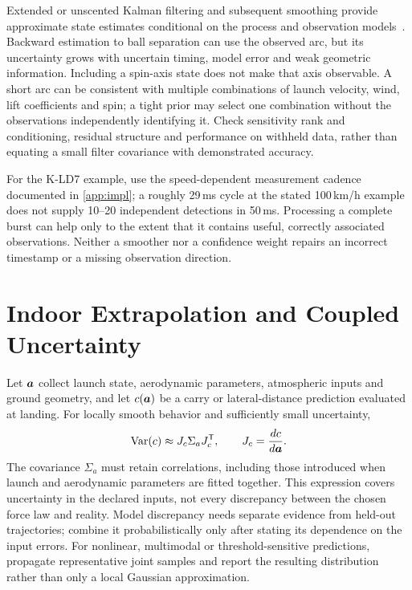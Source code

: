 Extended or unscented Kalman filtering and subsequent smoothing provide approximate state estimates conditional on the process and observation models~\cite{sarkkasvensson2023}.
Backward estimation to ball separation can use the observed arc, but its uncertainty grows with uncertain timing, model error and weak geometric information.
Including a spin-axis state does not make that axis observable.
A short arc can be consistent with multiple combinations of launch velocity, wind, lift coefficients and spin; a tight prior may select one combination without the observations independently identifying it.
Check sensitivity rank and conditioning, residual structure and performance on withheld data, rather than equating a small filter covariance with demonstrated accuracy.

For the K-LD7 example, use the speed-dependent measurement cadence documented in \cref{app:impl}; a roughly 29\,ms cycle at the stated 100\,km/h example does not supply 10--20 independent detections in 50\,ms.
Processing a complete burst can help only to the extent that it contains useful, correctly associated observations.
Neither a smoother nor a confidence weight repairs an incorrect timestamp or a missing observation direction.

\section{Indoor Extrapolation and Coupled Uncertainty}

Let $\bm{a}$ collect launch state, aerodynamic parameters, atmospheric inputs and ground geometry, and let $c(\bm{a})$ be a carry or lateral-distance prediction evaluated at landing.
For locally smooth behavior and sufficiently small uncertainty,
\begin{equation}
\label{eq:flightcovariance}
\operatorname{Var}(c)\approx J_c\Sigma_aJ_c^{\mathsf T},\qquad
J_c=\frac{dc}{d\bm{a}}.
\end{equation}
The covariance $\Sigma_a$ must retain correlations, including those introduced when launch and aerodynamic parameters are fitted together.
This expression covers uncertainty in the declared inputs, not every discrepancy between the chosen force law and reality.
Model discrepancy needs separate evidence from held-out trajectories; combine it probabilistically only after stating its dependence on the input errors.
For nonlinear, multimodal or threshold-sensitive predictions, propagate representative joint samples and report the resulting distribution rather than only a local Gaussian approximation.

